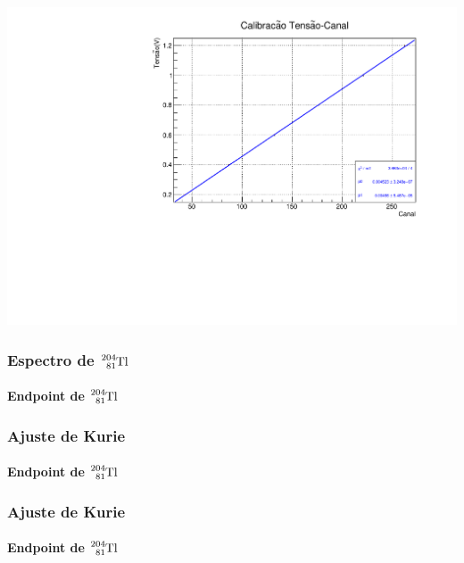 \documentclass[10pt]{beamer}
\begin{document}
\begin{frame}
{\begin{tabular}{l|llll}
                                 \hline  
                                 \hline
        \end{tabular}}
     \includegraphics[scale=0.25]{calib2.pdf}

\end{frame}

\begin{frame}\frametitle{Espectro de $\ce{^{204}_{81}Tl}$}\framesubtitle{Endpoint de $\ce{^{204}_{81}Tl}$}

  \begin{block}

  \end{block}

\end{frame}

\begin{frame}\frametitle{Ajuste de Kurie}\framesubtitle{Endpoint de $\ce{^{204}_{81}Tl}$}

  \begin{block}

  \end{block}

\end{frame}

\begin{frame}\frametitle{Ajuste de Kurie}\framesubtitle{Endpoint de $\ce{^{204}_{81}Tl}$}

  \begin{block}

  \end{block}

\end{frame}
\end{document}
